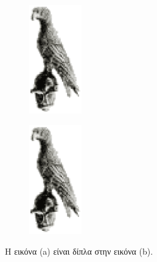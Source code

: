 \begin{figure}[t]
	\centering
	\begin{subfigure}[t]{0.49\textwidth}
		\centering
		\includegraphics[width=0.25\textwidth]{Figures/bird.eps}
		\caption{}
		\label{subfig:TwoBirdsA}
	\end{subfigure}
	\hfill
	\begin{subfigure}[t]{0.49\textwidth}
		\centering
		\includegraphics[width=0.25\textwidth]{Figures/bird.eps}
		\caption{}
		\label{subfig:TwoBirdsB}
	\end{subfigure}
	\caption{Η εικόνα (a) είναι δίπλα στην εικόνα (b).}
	\label{fig:TwoBirds}
\end{figure}